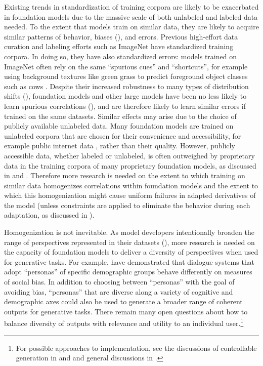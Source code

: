Existing trends in standardization of training corpora are likely to be exacerbated  in foundation models due to the massive scale of both unlabeled and labeled data needed. 
To the extent that models train on similar data, they are likely to acquire similar patterns of behavior, biases (), and errors. 
Previous high-effort data curation and labeling efforts such as ImageNet have standardized training corpora. 
In doing so, they have also standardized errors: models trained on ImageNet often rely on the same ``spurious cues'' and ``shortcuts'', for example using background textures like green grass to predict foreground object classes such as cows \citep{geirhos2020shortcut, hendrycks2021natural}.  
Despite their increased robustness to many types of distribution shifts (), foundation models and other large models have been no less likely to learn spurious correlations (), and are therefore likely to learn similar errors if trained on the same datasets. Similar effects may arise due to the choice of publicly available unlabeled data.  
Many foundation models are trained on unlabeled corpora that are chosen for their convenience and accessibility, for example public internet data \citep{caswell2021}, rather than their quality. 
However, publicly accessible data, whether labeled or unlabeled, is often outweighed by proprietary data in the training corpora of many proprietary foundation models, as discussed in \citep{marr2017} and . 
Therefore more research is needed on the extent to which training on similar data homogenizes correlations within foundation models and the extent to which this homogenization might cause uniform failures in adapted derivatives of the model (unless constraints are applied to eliminate the behavior during each adaptation, as discussed in ). 

Homogenization is not inevitable.  
As model developers intentionally broaden the range of perspectives represented in their datasets (), more research is needed on the capacity of foundation models to deliver a diversity of perspectives when used for generative tasks. 
For example, \citet{sheng2021revealing} have demonstrated that dialogue systems that adopt ``personas'' of specific demographic groups behave differently on measures of social bias. In addition to choosing between ``personas'' with the goal of avoiding bias, ``personas'' that are diverse along a variety of cognitive and demographic axes could also be used to generate a broader range of coherent outputs for generative tasks.  
There remain many open questions about how to balance diversity of outputs with relevance and utility to an individual user.\footnote{For possible approaches to implementation, see the discussions of controllable generation in \citep{keskar2019ctrl} and  and general discussions in \citep{dinan21}.} 


